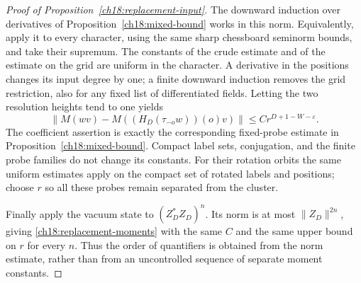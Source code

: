 \begin{proof}[Proof of Proposition~\ref{ch18:replacement-input}]
The downward induction over derivatives of Proposition~\ref{ch18:mixed-bound}
works in this norm. Equivalently, apply it to every character,
using the same sharp chessboard seminorm bounds, and take their supremum.
The constants of the crude estimate and of the estimate on the grid are uniform in the character.
A derivative in the positions changes its input degree by one; a finite
downward induction removes the grid restriction, also for any
fixed list of differentiated fields. Letting the two resolution
heights tend to one yields
\[
 \|M(wv)-M((H_D(\tau_{-o}w))(o)v)\|
                      \le C r^{D+1-W-\varepsilon}.
\]
The coefficient assertion is exactly the corresponding fixed-probe
estimate in Proposition~\ref{ch18:mixed-bound}. Compact label
sets, conjugation, and the finite probe families do not change
its constants. For their rotation orbits the same uniform estimates
apply on the compact set of rotated labels and positions; choose
$r$ so all these probes remain separated from the cluster.

Finally apply the vacuum state to $(Z_D^*Z_D)^n$. Its norm is
at most $\|Z_D\|^{2n}$, giving
\eqref{ch18:replacement-moments} with the same $C$ and the same
upper bound on $r$ for every $n$. Thus the order of quantifiers
is obtained from the norm estimate, rather than from an
uncontrolled sequence of separate moment constants.
\end{proof}
